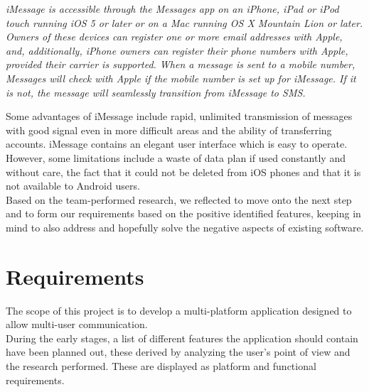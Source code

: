 \documentclass{article}
\begin{document}
	\textit{iMessage is accessible through the Messages app on an iPhone, iPad or iPod touch running iOS 5 or later or on a Mac running OS X Mountain Lion or later. Owners of these devices can register one or more email addresses with Apple, and, additionally, iPhone owners can register their phone numbers with Apple, provided their carrier is supported. When a message is sent to a mobile number, Messages will check with Apple if the mobile number is set up for iMessage. If it is not, the message will seamlessly transition from iMessage to SMS.}\par \cite{imessagedesc}
	
	Some advantages of iMessage include rapid, unlimited transmission of messages with good signal even in more difficult areas and the ability of transferring accounts. iMessage contains an elegant user interface which is easy to operate. However, some limitations include a waste of data plan if used constantly and without care, the fact that it could not be deleted from iOS phones and that it is not available to Android users. \\
	
	Based on the team-performed research, we reflected to move onto the next step and to form our requirements based on the positive identified features, keeping in mind to also address and hopefully solve the negative aspects of existing software.
	
	\section{Requirements}
	
	The scope of this project is to develop a multi-platform application designed to allow multi-user communication.\\
	During the early stages, a list of different features the application should contain have been planned out, these derived by analyzing the user's point of view and the research performed. These are displayed as platform and functional requirements.\par
	
\end{document}
